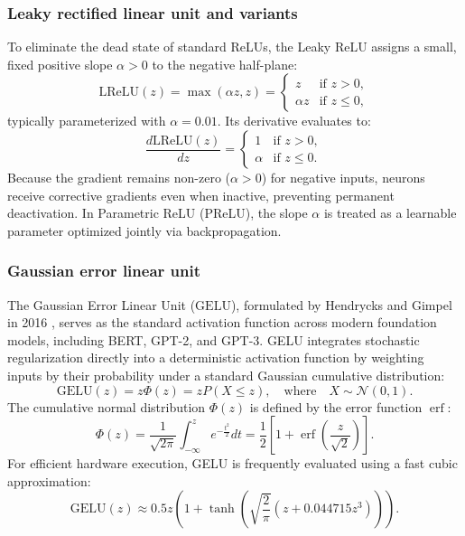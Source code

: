 \documentclass[../../../main.tex]{subfiles}
\begin{document}
\subsubsection{Leaky rectified linear unit and variants}

To eliminate the dead state of standard ReLUs, the Leaky ReLU assigns a small, fixed positive slope $\alpha > 0$ to the negative half-plane:
\begin{equation}
\text{LReLU}(z) = \max(\alpha z, z) = \begin{cases} 
z & \text{if } z > 0, \\ 
\alpha z & \text{if } z \le 0, 
\end{cases}
\end{equation}
typically parameterized with $\alpha = 0.01$. Its derivative evaluates to:
\begin{equation}
\frac{d\text{LReLU}(z)}{dz} = \begin{cases} 
1 & \text{if } z > 0, \\ 
\alpha & \text{if } z \le 0. 
\end{cases}
\end{equation}
Because the gradient remains non-zero ($\alpha > 0$) for negative inputs, neurons receive corrective gradients even when inactive, preventing permanent deactivation. In Parametric ReLU (PReLU), the slope $\alpha$ is treated as a learnable parameter optimized jointly via backpropagation.

\subsubsection{Gaussian error linear unit}

The Gaussian Error Linear Unit ($\text{GELU}$), formulated by Hendrycks and Gimpel in 2016 \citep{hendrycks2016gelu}, serves as the standard activation function across modern foundation models, including BERT, GPT-2, and GPT-3. GELU integrates stochastic regularization directly into a deterministic activation function by weighting inputs by their probability under a standard Gaussian cumulative distribution:
\begin{equation}
\text{GELU}(z) = z \Phi(z) = z P(X \le z), \quad \text{where} \quad X \sim \mathcal{N}(0, 1).
\end{equation}
The cumulative normal distribution $\Phi(z)$ is defined by the error function $\operatorname{erf}$:
\begin{equation}
\Phi(z) = \frac{1}{\sqrt{2\pi}} \int_{-\infty}^z e^{-\frac{t^2}{2}} dt = \frac{1}{2} \left[ 1 + \operatorname{erf}\left(\frac{z}{\sqrt{2}}\right) \right].
\end{equation}
For efficient hardware execution, GELU is frequently evaluated using a fast cubic approximation:
\begin{equation}
\text{GELU}(z) \approx 0.5z \left( 1 + \tanh\left( \sqrt{\frac{2}{\pi}} \left( z + 0.044715 z^3 \right) \right) \right).
\end{equation}
\end{document}
